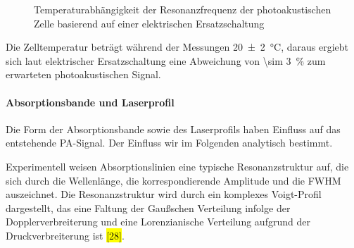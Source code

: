 

\begin{figure}[htb]
    \centering
    
    \caption{Temperaturabhängigkeit der Resonanzfrequenz der photoakustischen Zelle basierend auf einer elektrischen Ersatzschaltung}
    \label{fig:ResonanceTemperature}
\end{figure}

Die Zelltemperatur beträgt während der Messungen \SI{20\pm 2}{\celsius}, daraus ergiebt sich laut elektrischer Ersatzschaltung eine Abweichung von \SI{\sim 3}{\percent} zum erwarteten photoakustischen Signal.



\paragraph{Absorptionsbande und Laserprofil}
Die Form der Absorptionsbande sowie des Laserprofils haben Einfluss auf das entstehende \gls{PA}-Signal.
Der Einfluss wir im Folgenden analytisch bestimmt.
\par Experimentell weisen Absorptionslinien eine typische Resonanzstruktur auf, die sich durch die Wellenlänge, die korrespondierende Amplitude und die \gls{FWHM} auszeichnet.
Die Resonanzstruktur wird durch ein komplexes Voigt-Profil dargestellt, das eine Faltung der Gaußschen Verteilung infolge der Dopplerverbreiterung und eine Lorenzianische Verteilung aufgrund der Druckverbreiterung ist \hl{[28]}.

